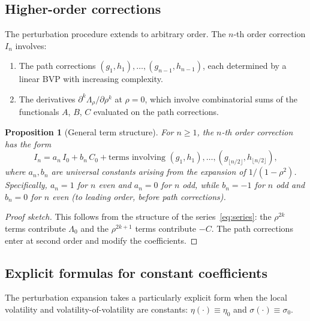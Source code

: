 \documentclass[11pt]{article}
\newtheorem{proposition}[theorem]{Proposition}
\theoremstyle{definition}
\begin{document}
\subsection{Higher-order corrections}\label{sec:higher_order}

The perturbation procedure extends to arbitrary order. The $n$-th order correction $I_n$ involves:
\begin{enumerate}[label=(\alph*)]
  \item The path corrections $(g_1, h_1), \ldots, (g_{n-1}, h_{n-1})$, each determined by a linear BVP with increasing complexity.
  \item The derivatives $\partial^k\Lambda_\rho/\partial\rho^k$ at $\rho = 0$, which involve combinatorial sums of the functionals $A$, $B$, $C$ evaluated on the path corrections.
\end{enumerate}

\begin{proposition}[General term structure]\label{prop:general_In}
For $n \geq 1$, the $n$-th order correction has the form
\begin{equation}
  I_n = a_n\,I_0 + b_n\,C_0 + \text{terms involving } (g_1, h_1), \ldots, (g_{\lfloor n/2 \rfloor}, h_{\lfloor n/2 \rfloor}),
\end{equation}
where $a_n, b_n$ are universal constants arising from the expansion of $1/(1-\rho^2)$. Specifically, $a_n = 1$ for $n$ even and $a_n = 0$ for $n$ odd, while $b_n = -1$ for $n$ odd and $b_n = 0$ for $n$ even (to leading order, before path corrections).
\end{proposition}

\begin{proof}[Proof sketch]
This follows from the structure of the series~\eqref{eq:series}: the $\rho^{2k}$ terms contribute $\Lambda_0$ and the $\rho^{2k+1}$ terms contribute $-C$. The path corrections enter at second order and modify the coefficients.
\end{proof}

\subsection{Explicit formulas for constant coefficients}\label{sec:constant}

The perturbation expansion takes a particularly explicit form when the local volatility and volatility-of-volatility are constants: $\eta(\cdot) \equiv \eta_0$ and $\sigma(\cdot) \equiv \sigma_0$.
\end{document}
